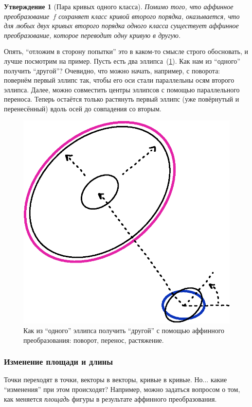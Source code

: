 \documentclass[a4paper,12pt]{article}
\newtheorem{proposition}{Утверждение}[section]
\begin{document}
  
  \begin{proposition}[Пара кривых одного класса]
    Помимо того, что аффинное преобразование~$f$ сохраняет класс кривой второго порядка, оказывается, что для любых двух кривых второго порядка одного класса существует аффинное преобразование, которое переводит одну кривую в другую.
  \end{proposition}
  
  \begin{example}
    Опять, ``отложим в сторону попытки'' это в каком-то смысле строго обосновать, и лучше посмотрим на пример.
    Пусть есть два эллипса~(\ref{fig:from-ellipse-to-ellipse}).
    Как нам из ``одного'' получить ``другой''?
    Очевидно, что можно начать, например, с поворота: повернём первый эллипс так, чтобы его оси стали параллельны осям второго эллипса.
    Далее, можно совместить центры эллипсов с помощью параллельного переноса.
    Теперь остаётся только растянуть первый эллипс (уже повёрнутый и перенесённый) вдоль осей до совпадения со вторым.
    
    \begin{figure}
      \centering
      
      \includegraphics[width=0.5\columnwidth]{from-ellipse-to-ellipse}
      
      \caption{Как из ``одного'' эллипса получить ``другой'' с помощью аффинного преобразования: поворот, перенос, растяжение.}
      \label{fig:from-ellipse-to-ellipse}
    \end{figure}
  \end{example}
  
  
  
  \subsubsection{Изменение площади и длины}
  
  Точки переходят в точки, векторы в векторы, кривые в кривые.
  Но... какие ``изменения'' при этом происходят?
  Например, можно задаться вопросом о том, как меняется \emph{площадь} фигуры в результате аффинного преобразования.
  
\end{document}
